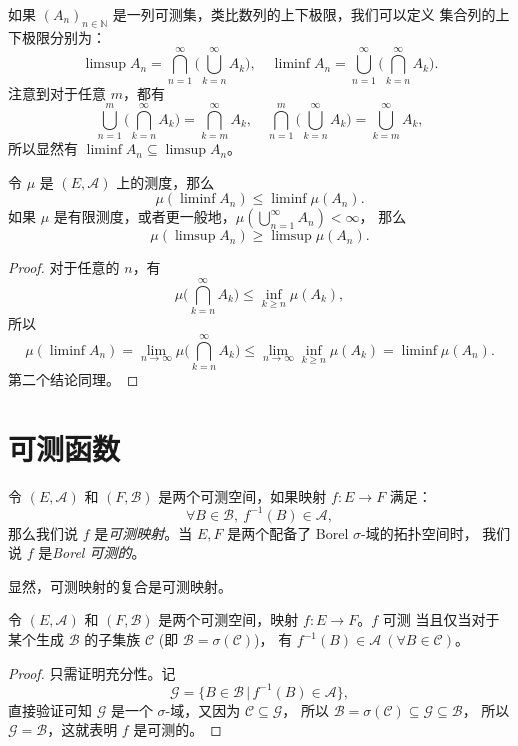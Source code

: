 \documentclass[fontset=none]{Notes}
\begin{document}
如果 $(A_n)_{n\in \mathbb{N}}$ 是一列可测集，类比数列的上下极限，我们可以定义
集合列的上下极限分别为：
\[
  \limsup A_n=\bigcap_{n=1}^\infty\biggl(\bigcup_{k=n}^\infty A_k\biggr),\quad
  \liminf A_n=\bigcup_{n=1}^\infty\biggl(\bigcap_{k=n}^\infty A_k\biggr).
\]
注意到对于任意 $m$，都有
\[
  \bigcup_{n=1}^m\biggl(\bigcap_{k=n}^\infty A_k\biggr)
  =\bigcap_{k=m}^\infty A_k,\quad 
  \bigcap_{n=1}^m\biggl(\bigcup_{k=n}^\infty A_k\biggr)=\bigcup_{k=m}^\infty A_k,
\]
所以显然有 $\liminf A_n\subseteq \limsup A_n$。

\begin{lemma}\label{lemma:liminf and limsup ineq}
  令 $\mu$ 是 $(E,\mathcal{A})$ 上的测度，那么
  \[
    \mu(\liminf A_n)\leq \liminf \mu(A_n).
  \]
  如果 $\mu$ 是有限测度，或者更一般地，$\mu\left(\bigcup_{n=1}^\infty A_n\right)<\infty$，
  那么
  \[
    \mu(\limsup A_n)\geq\limsup\mu(A_n).
  \]
\end{lemma}
\begin{proof}
  对于任意的 $n$，有 
  \[
    \mu\biggl(\bigcap_{k=n}^\infty A_k\biggr)\leq \inf_{k\geq n}\mu(A_k),
  \]
  所以
  \[
    \mu(\liminf A_n)=\lim_{n\to\infty}\mu\biggl(\bigcap_{k=n}^\infty A_k\biggr)
    \leq \lim_{n\to\infty}\inf_{k\geq n}\mu(A_k)=\liminf \mu(A_n).
  \]
  第二个结论同理。
\end{proof}

\section{可测函数}

\begin{definition}
  令 $(E,\mathcal{A})$ 和 $(F,\mathcal{B})$ 是两个可测空间，如果映射 $f:E\to F$ 满足：
  \[
    \forall B\in \mathcal{B},\  f^{-1}(B)\in \mathcal{A},
  \]
  那么我们说 $f$ 是\emph{可测映射}。当 $E,F$ 是两个配备了 Borel $\sigma$-域的拓扑空间时，
  我们说 $f$ 是\emph{Borel 可测的}。
\end{definition}

显然，可测映射的复合是可测映射。

\begin{proposition}
  令 $(E,\mathcal{A})$ 和 $(F,\mathcal{B})$ 是两个可测空间，映射 $f:E\to F$。$f$ 可测
  当且仅当对于某个生成 $\mathcal{B}$ 的子集族 $\mathcal{C}$ (即 $\mathcal{B}=\sigma(\mathcal{C})$)，
  有 $f^{-1}(B)\in \mathcal{A}\ (\forall B\in \mathcal{C})$。
\end{proposition}
\begin{proof}
  只需证明充分性。记
  \[
    \mathcal{G}=\{B\in \mathcal{B}\,|\, f^{-1}(B)\in \mathcal{A}\},
  \]
  直接验证可知 $\mathcal{G}$ 是一个 $\sigma$-域，又因为 $\mathcal{C}\subseteq \mathcal{G}$，
  所以 $\mathcal{B}=\sigma(\mathcal{C})\subseteq \mathcal{G}\subseteq \mathcal{B}$，
  所以 $\mathcal{G}=\mathcal{B}$，这就表明 $f$ 是可测的。
\end{proof}
\end{document}
